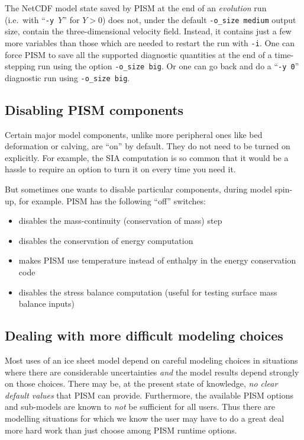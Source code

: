The NetCDF model state saved by PISM at the end of an \emph{evolution} run (i.e.~with ``\texttt{-y }$Y$'' for $Y>0$) does not, under the default \texttt{-o_size medium} output size, contain the three-dimensional velocity field.  Instead, it contains just a few more variables than those which are needed to restart the run with \texttt{-i}.  One can  force PISM to save all the supported diagnostic quantities at the end of a time-stepping run using the option \texttt{-o_size big}.  Or one can go back and do a ``\texttt{-y 0}'' diagnostic run using \texttt{-o_size big}.


\subsection{Disabling PISM components}
\label{sec:turning-off}

Certain major model components, unlike more peripheral ones like bed deformation or calving, are ``on'' by default.  They do not need to be turned on explicitly.  For example, the SIA computation is so common that it would be a hassle to require an option to turn it on every time you need it.

But sometimes one wants to disable particular components, during model spin-up, for example.  PISM has the following ``off'' switches:
\begin{itemize}
\item {} disables the mass-continuity (conservation of mass) step
\item {} disables the conservation of energy computation
\item {} makes PISM use temperature instead of enthalpy in the energy conservation code
\item {} disables the stress balance computation (useful for testing surface mass balance inputs)
\end{itemize}


\subsection{Dealing with more difficult modeling choices}
\label{subsec:hard-choices}

Most uses of an ice sheet model depend on careful modeling choices in situations where there are considerable uncertainties \emph{and} the model results depend strongly on those choices.  There may be, at the present state of knowledge, \emph{no clear default values} that PISM can provide.  Furthermore, the available PISM options and sub-models are known to \emph{not} be sufficient for all users.  Thus there are modelling situations for which we know the user may have to do a great deal more hard work than just choose among PISM runtime options.

